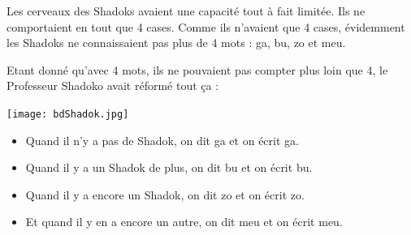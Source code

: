 \documentclass[11pt,a4paper]{article}
\begin{document}
\begin{minipage}{9.75cm}
Les cerveaux des Shadoks avaient une capacité tout à fait limitée.
Ils ne comportaient en tout que 4 cases.
Comme ils n'avaient que 4 cases, évidemment les Shadoks ne connaissaient 
pas plus de 4 mots :  {\sc ga, bu, zo et meu}.

Etant donné qu'avec 4 mots, ils ne pouvaient pas compter plus loin que 4,
le Professeur Shadoko avait réformé tout ça :
\end{minipage}
\hfill
\begin{minipage}{6cm}
\mbox{}\hfill\texttt{[image: bdShadok.jpg]}
\end{minipage}
\begin{itemize}
\item Quand il n'y a pas de Shadok, on dit {\sc ga} et on écrit {\sc ga}.
\item Quand il y a un Shadok de plus, on dit {\sc bu} et on écrit {\sc bu}.
\item Quand il y a encore un Shadok, on dit {\sc zo} et on écrit {\sc zo}.
\item Et quand il y en a encore un autre, on dit {\sc meu} et on écrit {\sc meu}.
\end{itemize}
\end{document}
